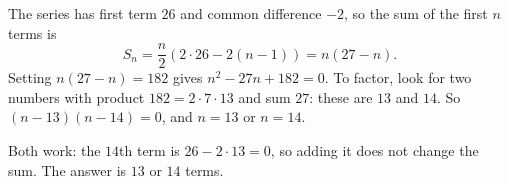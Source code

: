 The series has first term $26$ and common difference $-2$, so the sum of the first $n$ terms is
\[S_n=\dfrac n2\left(2\cdot26-2(n-1)\right)=n(27-n).\]
Setting $n(27-n)=182$ gives $n^2-27n+182=0$. To factor, look for two numbers with product $182=2\cdot7\cdot13$ and sum $27$: these are $13$ and $14$. So $(n-13)(n-14)=0$, and $n=13$ or $n=14$.

Both work: the $14$th term is $26-2\cdot13=0$, so adding it does not change the sum. The answer is $\boxed{13\text{ or }14}$ terms.
